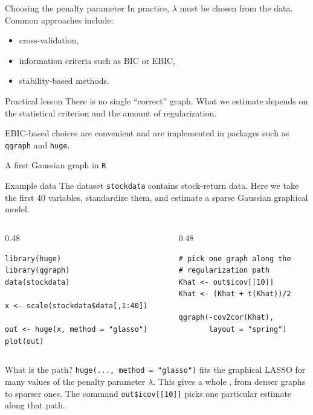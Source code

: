 \documentclass[dvipsnames,aspectratio=169,handout]{beamer}
\begin{document}
\begin{frame}{Choosing the penalty parameter}
In practice, $\lambda$ must be chosen from the data.
Common approaches include:
\begin{itemize}
    \item cross-validation,
    \item information criteria such as BIC or EBIC,
    \item stability-based methods.
\end{itemize}

\begin{alertblock}{Practical lesson}
There is no single ``correct'' graph.
What we estimate depends on the statistical criterion and the amount of regularization.
\end{alertblock}

\begin{block}{}
EBIC-based choices are convenient and are implemented in packages such as \texttt{qgraph} and \texttt{huge}.
\end{block}
\end{frame}

\begin{frame}[fragile]{A first Gaussian graph in \texttt{R}}

\begin{block}{Example data}
The dataset \texttt{stockdata} contains stock-return data.
Here we take the first 40 variables, standardize them, and estimate a sparse Gaussian graphical model.
\end{block}

\begin{columns}[T,onlytextwidth]
\begin{column}{0.48\textwidth}
\begin{lstlisting}
library(huge)
library(qgraph)
data(stockdata)

x <- scale(stockdata$data[,1:40])

out <- huge(x, method = "glasso")
plot(out)
\end{lstlisting}
\end{column}
\begin{column}{0.48\textwidth}
\begin{lstlisting}
# pick one graph along the
# regularization path
Khat <- out$icov[[10]]
Khat <- (Khat + t(Khat))/2

qgraph(-cov2cor(Khat),
       layout = "spring")
\end{lstlisting}
\end{column}
\end{columns}

\begin{alertblock}{What is the path?}
\texttt{huge(..., method = "glasso")} fits the graphical LASSO for many values of the penalty parameter $\lambda$.
This gives a whole , from denser graphs to sparser ones.
The command \texttt{out\$icov[[10]]} picks one particular estimate along that path.
\end{alertblock}
\end{frame}
\end{document}
